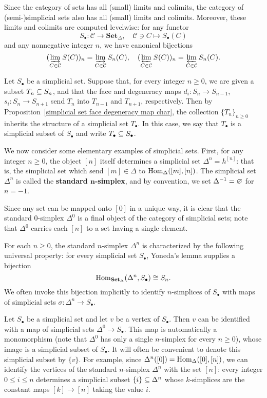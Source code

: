 \begin{remark}
Since the category of sets has all (small) limits and colimits, the category of (semi-)simplicial sets also has all (small) limits and colimits. Moreover, these limits and colimits are computed levelwise: for any functor
\[S_\bullet:\mathcal{C}\to\mathbf{Set}_{\Delta},\quad \mathcal{C}\ni C\mapsto S_\bullet(C)\]
and any nonnegative integer $n$, we have canonical bijections
\[(\varinjlim\limits_{C\in\mathcal{C}}S(C))_n=\varinjlim\limits_{C\in\mathcal{C}}S_n(C),\quad (\varprojlim\limits_{C\in\mathcal{C}}S(C))_n=\varprojlim\limits_{C\in\mathcal{C}}S_n(C).\]
\end{remark}
\begin{example}
Let $S_\bullet$ be a simplicial set. Suppose that, for every integer $n\geq 0$, we are given a subset $T_n\subseteq S_n$, and that the face and degeneracy maps $d_i:S_n\to S_{n-1}$, $s_i:S_n\to S_{n+1}$ send $T_n$ into $T_{n-1}$ and $T_{n+1}$, respectively. Then by Proposition~\ref{simplicial set face degeneracy map char}, the collection $\{T_n\}_{n\geq 0}$ inherits the structure of a simplicial set $T_\bullet$. In this case, we say that $T_\bullet$ is a simplicial subset of $S_\bullet$ and write $T_\bullet\subseteq S_\bullet$.
\end{example}
We now consider some elementary examples of simplicial sets. First, for any integer $n\geq 0$, the object $[n]$ itself determines a simplicial set $\Delta^n=h^{[n]}$: that is, the simplicial set which send $[m]\in\Delta$ to $\mathrm{Hom}_\Delta([m],[n])$. The simplicial set $\Delta^n$ is called the \textbf{standard $\bm{n}$-simplex}, and by convention, we set $\Delta^{-1}=\varnothing$ for $n=-1$.\par
Since any set can be mapped onto $[0]$ in a unique way, it is clear that the standard $0$-simplex $\Delta^0$ is a final object of the category of simplicial sets; note that $\Delta^0$ carries each $[n]$ to a set having a single element.\par
For each $n\geq 0$, the standard $n$-simplex $\Delta^n$ is characterized by the following universal property: for every simplicial set $S_\bullet$, Yoneda's lemma supplies a bijection
\[\mathrm{Hom}_{\mathbf{Set}_{\Delta}}(\Delta^n,S_\bullet)\cong S_n.\]
We often invoke this bijection implicitly to identify $n$-simplices of $S_\bullet$ with maps of simplicial sets $\sigma:\Delta^n\to S_\bullet$.
\begin{example}
Let $S_\bullet$ be a simplicial set and let $v$ be a vertex of $S_\bullet$. Then $v$ can be identified with a map of simplicial sets $\Delta^0\to S_\bullet$. This map is automatically a monomorphism (note that $\Delta^0$ has only a single $n$-simplex for every $n\geq 0$), whose image is a simplicial subset of $S_\bullet$. It will often be convenient to denote this simplicial subset by $\{v\}$. For example, since $\Delta^n([0])=\mathrm{Hom}_{\Delta}([0],[n])$, we can identify the vertices of the standard $n$-simplex $\Delta^n$ with the set $[n]$: every integer $0\leq i\leq n$ determines a simplicial subset $\{i\}\subseteq\Delta^n$ whose $k$-simplices are the constant maps $[k]\to[n]$ taking the value $i$.
\end{example}
